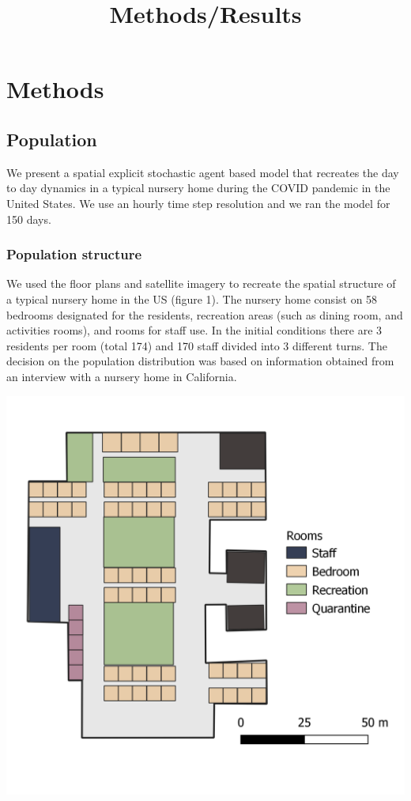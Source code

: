 \documentclass[
]{article}
\title{Methods/Results}
\author{}
\date{\vspace{-2.5em}}
\begin{document}
\maketitle

\hypertarget{methods}{%
\section{Methods}\label{methods}}

\hypertarget{population}{%
\subsection{Population}\label{population}}

We present a spatial explicit stochastic agent based model that
recreates the day to day dynamics in a typical nursery home during the
COVID pandemic in the United States. We use an hourly time step
resolution and we ran the model for 150 days.

\hypertarget{population-structure}{%
\subsubsection{Population structure}\label{population-structure}}

We used the floor plans and satellite imagery to recreate the spatial
structure of a typical nursery home in the US (figure 1). The nursery
home consist on 58 bedrooms designated for the residents, recreation
areas (such as dining room, and activities rooms), and rooms for staff
use. In the initial conditions there are 3 residents per room (total
174) and 170 staff divided into 3 different turns. The decision on the
population distribution was based on information obtained from an
interview with a nursery home in California.

\includegraphics{Figures/NH_B}
\end{document}
